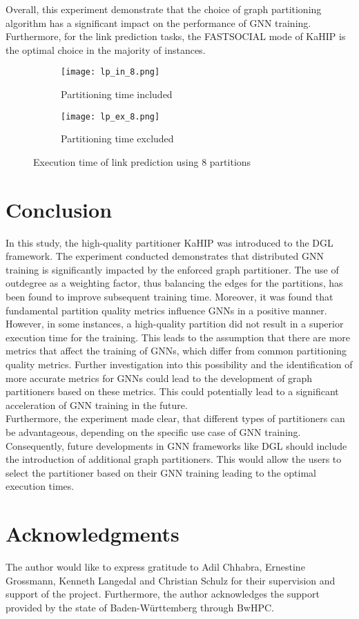 \documentclass[acmsmall,nonacm,screen,review]{acmart}
\begin{document}
Overall, this experiment demonstrate that the choice of graph partitioning algorithm has a significant impact on the performance of GNN training. Furthermore, for the link prediction tasks, the FASTSOCIAL mode of KaHIP is the optimal choice in the majority of instances.
\begin{figure}[bt!]
     \centering
     \begin{subfigure}[b]{0.45\textwidth}
         \centering
         \texttt{[image: lp\_in\_8.png]}
         \caption{Partitioning time included}
         \label{lp_in_4}
     \end{subfigure}
     \hfill
     \begin{subfigure}[b]{0.45\textwidth}
         \centering
         \texttt{[image: lp\_ex\_8.png]}
         \caption{Partitioning time excluded}
         \label{lp_ex_4}
     \end{subfigure}
     \caption{Execution time of link prediction using 8 partitions}
     \label{lp_results}
\end{figure}
\section{Conclusion}
In this study, the high-quality partitioner KaHIP was introduced to the DGL framework. The experiment conducted demonstrates that distributed GNN training is significantly impacted by the enforced graph partitioner. The use of outdegree as a weighting factor, thus balancing the edges for the partitions, has been found to improve subsequent training time. Moreover, it was found that fundamental partition quality metrics influence GNNs in a positive manner.\\
However, in some instances, a high-quality partition did not result in a superior execution time for the training. This leads to the assumption that there are more metrics that affect the training of GNNs, which differ from common partitioning quality metrics. Further investigation into this possibility and the identification of more accurate metrics for GNNs could lead to the development of graph partitioners based on these metrics. This could potentially lead to a significant acceleration of GNN training in the future.\\
Furthermore, the experiment made clear, that different types of partitioners can be advantageous, depending on the specific use case of GNN training. Consequently, future developments in GNN frameworks like DGL should include the introduction of additional graph partitioners. This would allow the users to select the partitioner based on their GNN training leading to the optimal execution times.
\section{Acknowledgments}
The author would like to express gratitude to Adil Chhabra, Ernestine Grossmann, Kenneth Langedal and Christian Schulz for their supervision and support of the project. Furthermore, the author acknowledges the support provided by the state of Baden-Württemberg through BwHPC.


\end{document}
